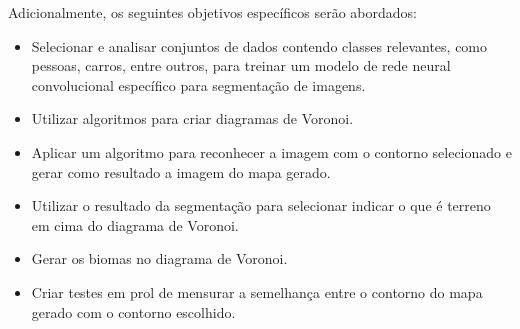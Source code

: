 Adicionalmente, os seguintes objetivos específicos serão abordados:

\begin{itemize}
	\item Selecionar e analisar conjuntos de dados contendo classes relevantes, como pessoas, carros, entre outros, para treinar um modelo de rede neural convolucional específico para segmentação de imagens.
	\item Utilizar algoritmos para criar diagramas de Voronoi.
	\item Aplicar um algoritmo para reconhecer a imagem com o contorno selecionado e gerar como resultado a imagem do mapa gerado.
	\item Utilizar o resultado da segmentação para selecionar indicar o que é terreno em cima do diagrama de Voronoi.
	\item Gerar os biomas no diagrama de Voronoi.
	\item Criar testes em prol de mensurar a semelhança entre o contorno do mapa gerado com o contorno escolhido.
\end{itemize}